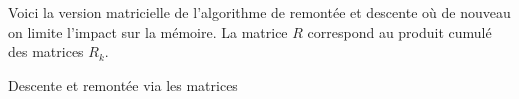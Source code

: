 Voici la version matricielle de l'algorithme de remontée et descente où de nouveau on limite l'impact sur la mémoire. La matrice $R$ correspond au produit cumulé des matrices $R_k$.


{\small
\begin{algo}[frame]
	\caption{Descente et remontée via les matrices} \label{algo-human-matrix}
	\BlankLine
\end{algo}
}
